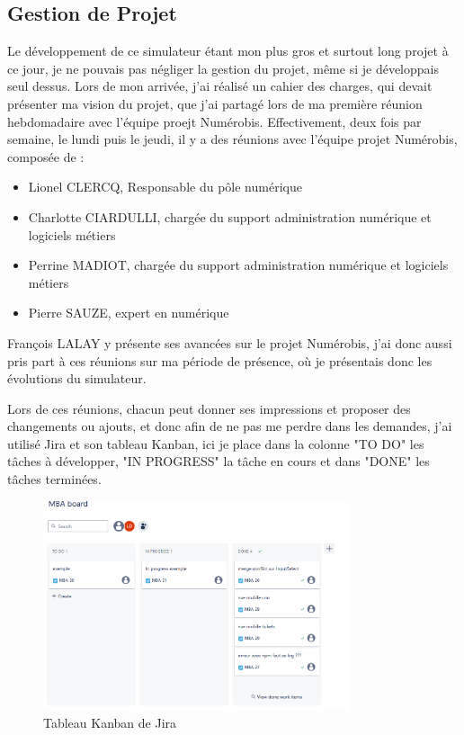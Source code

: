 \documentclass[a4paper,12pt]{report}
\begin{document}
\subsection{Gestion de Projet}
Le développement de ce simulateur étant mon plus gros et surtout long projet à ce jour, je ne pouvais pas négliger la gestion du projet, même si je développais seul dessus. Lors de mon arrivée, j'ai réalisé un cahier des charges, qui devait présenter ma vision du projet, que j'ai partagé lors de ma première réunion hebdomadaire avec l'équipe proejt Numérobis. Effectivement, deux fois par semaine, le lundi puis le jeudi, il y a des réunions avec l'équipe projet Numérobis, composée de :
\begin{itemize}
    \item Lionel CLERCQ, Responsable du pôle numérique
    \item Charlotte CIARDULLI, chargée du support administration numérique et logiciels métiers
    \item Perrine MADIOT, chargée du support administration numérique et logiciels métiers
    \item Pierre SAUZE, expert en numérique
\end{itemize}
François LALAY y présente ses avancées sur le projet Numérobis, j'ai donc aussi pris part à ces réunions sur ma période de présence, où je présentais donc les évolutions du simulateur. 


Lors de ces réunions, chacun peut donner ses impressions et proposer des changements ou ajouts, et donc afin de ne pas me perdre dans les demandes, j'ai utilisé Jira et son tableau Kanban, ici je place dans la colonne "TO DO" les tâches à développer, "IN PROGRESS" la tâche en cours et dans "DONE" les tâches terminées.

\begin{figure}[H]
    \centering
    \includegraphics[width=0.8\textwidth]{kanban.png}
    \caption{Tableau Kanban de Jira}
    \label{fig:kanban-jira}
\end{figure}
\end{document}
